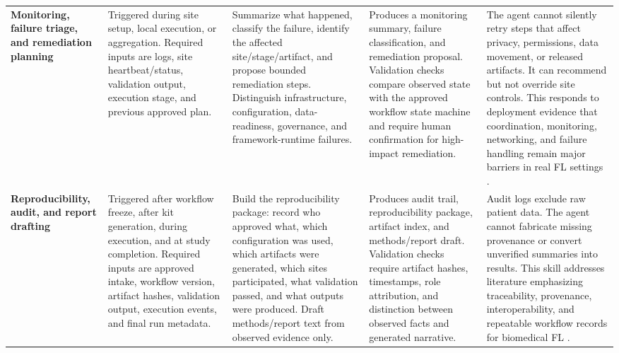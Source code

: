 \documentclass[preprint,5p, 10pt, times]{elsarticle}
\begin{document}
\begin{table}[t]
\begin{tabularx}{\textwidth}{
>{\raggedright\arraybackslash}p{2.4cm}
>{\raggedright\arraybackslash}p{2.7cm}
>{\raggedright\arraybackslash}X
>{\raggedright\arraybackslash}X
>{\raggedright\arraybackslash}X}
\textbf{Monitoring, failure triage, and remediation planning}
& Triggered during site setup, local execution, or aggregation. Required inputs are logs, site heartbeat/status, validation output, execution stage, and previous approved plan.
& Summarize what happened, classify the failure, identify the affected site/stage/artifact, and propose bounded remediation steps. Distinguish infrastructure, configuration, data-readiness, governance, and framework-runtime failures.
& Produces a monitoring summary, failure classification, and remediation proposal. Validation checks compare observed state with the approved workflow state machine and require human confirmation for high-impact remediation.
& The agent cannot silently retry steps that affect privacy, permissions, data movement, or released artifacts. It can recommend but not override site controls. This responds to deployment evidence that coordination, monitoring, networking, and failure handling remain major barriers in real FL settings \cite{schoenpflug2025navigating,moon2024fedops}. \\
\addlinespace[3pt]

\textbf{Reproducibility, audit, and report drafting}
& Triggered after workflow freeze, after kit generation, during execution, and at study completion. Required inputs are approved intake, workflow version, artifact hashes, validation output, execution events, and final run metadata.
& Build the reproducibility package: record who approved what, which configuration was used, which artifacts were generated, which sites participated, what validation passed, and what outputs were produced. Draft methods/report text from observed evidence only.
& Produces audit trail, reproducibility package, artifact index, and methods/report draft. Validation checks require artifact hashes, timestamps, role attribution, and distinction between observed facts and generated narrative.
& Audit logs exclude raw patient data. The agent cannot fabricate missing provenance or convert unverified summaries into results. This skill addresses literature emphasizing traceability, provenance, interoperability, and repeatable workflow records for biomedical FL \cite{schlegel2026lowering,chavero2026federated,chai2024survey,nist2023airmf}. \\
\bottomrule
\end{tabularx}
\end{table}
\end{document}
